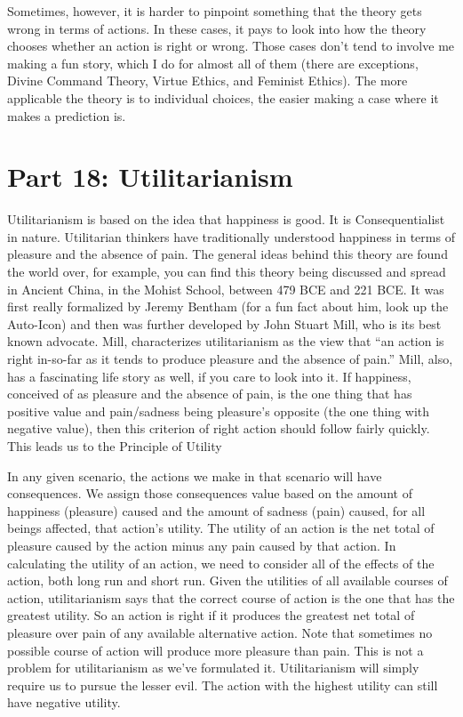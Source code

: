 Sometimes, however, it is harder to pinpoint something that the theory gets wrong in terms of actions. In these cases, it pays to look into how the theory chooses whether an action is right or wrong. Those cases don’t tend to involve me making a fun story, which I do for almost all of them (there are exceptions, Divine Command Theory, Virtue Ethics, and Feminist Ethics). The more applicable the theory is to individual choices, the easier making a case where it makes a prediction is.

\chapter{Part 18: Utilitarianism}

Utilitarianism is based on the idea that happiness is good. It is Consequentialist in nature. Utilitarian thinkers have traditionally understood happiness in terms of pleasure and the absence of pain. The general ideas behind this theory are found the world over, for example, you can find this theory being discussed and spread in Ancient China, in the Mohist School, between 479 BCE and 221 BCE. It was first really formalized by Jeremy Bentham (for a fun fact about him, look up the Auto-Icon) and then was further developed by John Stuart Mill, who is its best known advocate. Mill, characterizes utilitarianism as the view that “an action is right in-so-far as it tends to produce pleasure and the absence of pain.” Mill, also, has a fascinating life story as well, if you care to look into it.  If happiness, conceived of as pleasure and the absence of pain, is the one thing that has positive value and pain/sadness being pleasure's opposite (the one thing with negative value), then this criterion of right action should follow fairly quickly. This leads us to the Principle of Utility

In any given scenario, the actions we make in that scenario will have consequences. We assign those consequences value based on the amount of happiness (pleasure) caused and the amount of sadness (pain) caused, for all beings affected, that action's utility. The utility of an action is the net total of pleasure caused by the action minus any pain caused by that action. In calculating the utility of an action, we need to consider all of the effects of the action, both long run and short run. Given the utilities of all available courses of action, utilitarianism says that the correct course of action is the one that has the greatest utility. So an action is right if it produces the greatest net total of pleasure over pain of any available alternative action. Note that sometimes no possible course of action will produce more pleasure than pain. This is not a problem for utilitarianism as we’ve formulated it. Utilitarianism will simply require us to pursue the lesser evil. The action with the highest utility can still have negative utility.

